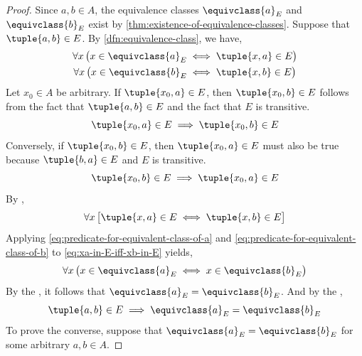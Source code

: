 \begin{proof}
    Since \( a,b \in A\), the equivalence classes \( \equivclass{a}_{E} \) and \( \equivclass{b}_{E} \) exist by
    \cref{thm:existence-of-equivalence-classes}. Suppose that \( \tuple{a,b} \in E \). By \cref{dfn:equivalence-class},
    we have,
    \begin{gather}
        \forall x \, \big( x \in \equivclass{a}_{E} \iff \tuple{x,a} \in E \big) \label{eq:predicate-for-equivalent-class-of-a} \\
        \forall x \, \big( x \in \equivclass{b}_{E} \iff \tuple{x,b} \in E \big) \label{eq:predicate-for-equivalent-class-of-b}
    \end{gather}
    Let \( x_{0} \in A \) be arbitrary. If \( \tuple{x_{0}, a} \in E \), then \( \tuple{x_{0}, b} \in E \) follows from the fact that
    \( \tuple{a,b} \in E \) and the fact that \( E \) is transitive.
    \begin{equation*}
        \tuple{x_{0}, a} \in E \implies \tuple{x_{0}, b} \in E
    \end{equation*}
    Conversely, if \( \tuple{x_{0},b} \in E \), then \( \tuple{x_{0}, a} \in E \) must also be true because \( \tuple{b,a} \in E \) and
    \( E \) is transitive.
    \begin{equation*}
        \tuple{x_{0},b} \in E \implies \tuple{x_{0},a} \in E
    \end{equation*}
    By ,
    \begin{equation}
        \label{eq:xa-in-E-iff-xb-in-E}
        \forall x \, \big[ \tuple{x,a} \in E \iff \tuple{x,b} \in E \big]
    \end{equation}
    Applying \eqref{eq:predicate-for-equivalent-class-of-a} and \eqref{eq:predicate-for-equivalent-class-of-b}
    to \eqref{eq:xa-in-E-iff-xb-in-E} yields,
    \begin{equation*}
        \forall x \, \big( x \in \equivclass{a}_{E} \iff x \in \equivclass{b}_{E} \big)
    \end{equation*}
    By the , it follows that \( \equivclass{a}_{E} = \equivclass{b}_{E} \).
    And by the ,
    \begin{equation}
        \label{eq:ab-in-E-implies-equal-equivalent-classes}
        \tuple{a,b} \in E \implies \equivclass{a}_{E} = \equivclass{b}_{E}
    \end{equation}
    To prove the converse, suppose that \( \equivclass{a}_{E} = \equivclass{b}_{E} \) for some arbitrary \( a,b \in A \).

\end{proof}
